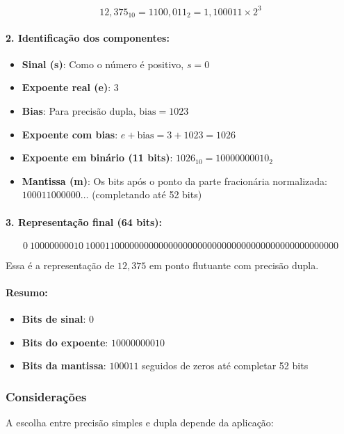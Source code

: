 \[
12{,}375_{10} = 1100{,}011_2 = 1{,}100011 \times 2^3
\]

\paragraph{2. Identificação dos componentes:}

\begin{itemize}
  \item \textbf{Sinal (s)}: Como o número é positivo, \( s = 0 \)
  \item \textbf{Expoente real (e)}: \( 3 \)
  \item \textbf{Bias}: Para precisão dupla, \( \text{bias} = 1023 \)
  \item \textbf{Expoente com bias}: \( e + \text{bias} = 3 + 1023 = 1026 \)
  \item \textbf{Expoente em binário (11 bits)}: \( 1026_{10} = 10000000010_2 \)
  \item \textbf{Mantissa (m)}: Os bits após o ponto da parte fracionária normalizada: \( 100011000000\ldots \) (completando até 52 bits)
\end{itemize}

\paragraph{3. Representação final (64 bits):}

\[
\boxed{
0\ 10000000010\ 1000110000000000000000000000000000000000000000000000
}
\]

\noindent Essa é a representação de \( 12{,}375 \) em ponto flutuante com precisão dupla.

\paragraph{Resumo:}
\begin{itemize}
  \item \textbf{Bits de sinal}: \( 0 \)
  \item \textbf{Bits do expoente}: \( 10000000010 \)
  \item \textbf{Bits da mantissa}: \( 100011 \) seguidos de zeros até completar 52 bits
\end{itemize}


\subsubsection*{Considerações}

A escolha entre precisão simples e dupla depende da aplicação:



